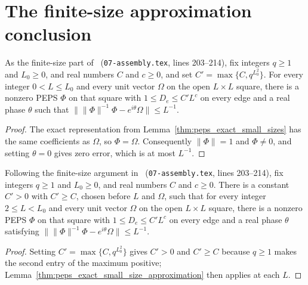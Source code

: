 \section{The finite-size approximation conclusion}
\label{sec:peps_exact_small_size_approximation}

\begin{lemma}
    \label{thm:peps_exact_small_size_approximation}
    \leanok
    As the finite-size part of~\cite[Section~8]{OpenAI2026PolynomialPEPS}
    (\texttt{07-assembly.tex}, lines 203--214), fix integers $q\ge1$ and
    $L_0\ge0$, and real numbers $C$ and $c\ge0$, and set
    $C'=\max\{C,q^{L_0^2}\}$. For every integer $0<L\le L_0$ and every
    unit vector $\Omega$ on the open $L\times L$ square, there is a nonzero
    PEPS $\Phi$ on that square with $1\le D_e\le C'L^c$ on every edge and a
    real phase $\theta$ such that
    $\|\|\Phi\|^{-1}\Phi-e^{i\theta}\Omega\|\le L^{-1}$.
\end{lemma}
\begin{proof}
    \leanok
    The exact representation from Lemma~\ref{thm:peps_exact_small_sizes}
    has the same coefficients as $\Omega$, so $\Phi=\Omega$.
    Consequently $\|\Phi\|=1$ and $\Phi\ne0$, and setting $\theta=0$ gives
    zero error, which is at most $L^{-1}$.
\end{proof}

\begin{lemma}
    \label{thm:peps_uniform_small_size_approximation}
    \leanok
    Following the finite-size argument
    in~\cite[Section~8]{OpenAI2026PolynomialPEPS}
    (\texttt{07-assembly.tex}, lines 203--214), fix integers $q\ge1$ and
    $L_0\ge0$, and real numbers $C$ and $c\ge0$.
    There is a constant $C'>0$ with $C'\ge C$, chosen before $L$ and $\Omega$,
    such that for every integer
    $2\le L<L_0$ and every unit vector $\Omega$ on the open $L\times L$ square,
    there is a nonzero PEPS $\Phi$ on that square with
    $1\le D_e\le C'L^c$ on every edge and a real phase $\theta$ satisfying
    $\|\|\Phi\|^{-1}\Phi-e^{i\theta}\Omega\|\le L^{-1}$.
\end{lemma}
\begin{proof}
    \leanok
    Setting $C'=\max\{C,q^{L_0^2}\}$ gives $C'>0$ and $C'\ge C$ because
    $q\ge1$ makes the second entry of the maximum positive;
    Lemma~\ref{thm:peps_exact_small_size_approximation} then applies at
    each $L$.
\end{proof}
